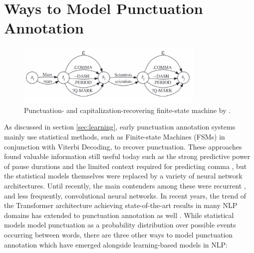 \documentclass[bsc,deptreport,ai]{infthesis} %
\begin{document}
\section{Ways to Model Punctuation Annotation}
\label{sec:model}
\begin{figure}
\centering
\includegraphics[width=0.8\textwidth]{gravanofst.PNG}
\caption{Punctuation- and capitalization-recovering finite-state machine by \citet{gravano2009}.}
\end{figure}

As discussed in section \ref{sec:learning}, early punctuation annotation systems mainly use statistical methods, such as Finite-state Machines (FSMs) in conjunction with Viterbi Decoding, to recover punctuation. These approaches found valuable information still useful today such as the strong predictive power of pause durations \citep{christensen2001} and the limited context required for predicting comma \citep{beeferman1998}, but the statistical models themselves were replaced by a variety of neural network architectures. Until recently, the main contenders among these were recurrent \citep{Tilk2015,Klejch2016,yitaowen2017}, and less frequently, convolutional \citep{che2016} neural networks. In recent years, the trend of the Transformer architecture achieving state-of-the-art results in many NLP domains \citep{transformersurvey} has extended to punctuation annotation as well \citep{yi2019speech2vec,chen2020controllable,sotapunctuation}. While statistical models model punctuation as a probability distribution over possible events occurring between words, there are three other ways to model punctuation annotation which have emerged alongside learning-based models in NLP:
\end{document}
